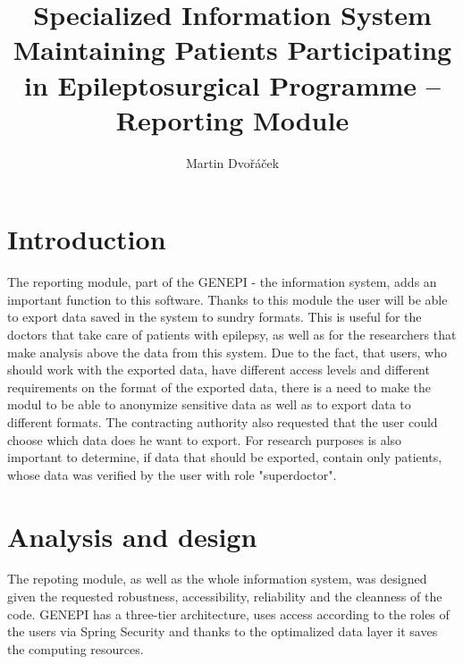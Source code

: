 \documentclass[thesis=B,english]{FITthesis}[2012/10/20]
\title{Specialized Information System Maintaining Patients Participating in Epileptosurgical Programme – Reporting Module}
\author{Martin Dvořáček} %
\begin{document}

\chapter{Introduction}
The reporting module, part of the GENEPI - the information system, adds an important function to this software. Thanks to this module the user will be able to export data saved in the system to sundry formats. This is useful for the doctors that take care of patients with epilepsy, as well as for the researchers that make analysis above the data from this system. Due to the fact, that users, who should work with the exported data, have different access levels and different requirements on the format of the exported data, there is a need to make the modul to be able to anonymize sensitive data as well as to export data to different formats. The contracting authority also requested that the user could choose which data does he want to export. For research purposes is also important to determine, if data that should be exported, contain only patients, whose data was verified by the user with role "superdoctor".


\chapter{Analysis and design}
The repoting module, as well as the whole information system, was designed given the requested robustness, accessibility, reliability and the cleanness of the code. GENEPI has a three-tier architecture, uses access according to the roles of the users via Spring Security and thanks to the optimalized data layer it saves the computing resources.
\end{document}
